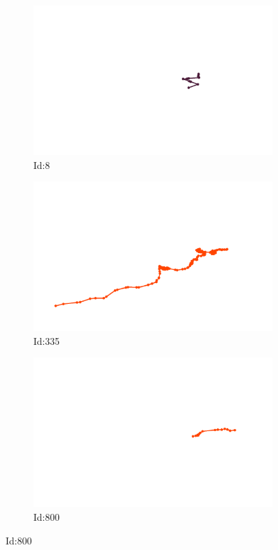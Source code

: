 \documentclass[12pt,twoside]{report}
\begin{document}
\begin{figure}
\centering
\begin{subfigure}[b]{0.20\textwidth}
\centering
\includegraphics[width=\textwidth]{../../trajectories/8.png}
\caption{Id:8}
\end{subfigure}
\begin{subfigure}[b]{0.20\textwidth}
\centering
\includegraphics[width=\textwidth]{../../trajectories/335.png}
\caption{Id:335}
\end{subfigure}
\begin{subfigure}[b]{0.20\textwidth}
\centering
\includegraphics[width=\textwidth]{../../trajectories/800.png}
\caption{Id:800}
\end{subfigure}
\end{figure}
\end{document}
